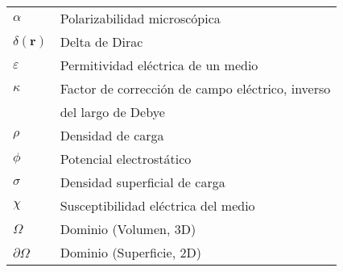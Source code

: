 \begin{tabular}{ll}
	$\alpha$ &  Polarizabilidad microscópica    \\
	$\delta(\mathbf{r})$ & Delta de Dirac     \\
	$\varepsilon$ & Permitividad eléctrica de un medio \\
	$\kappa$ &   Factor de corrección de campo eléctrico, inverso\\
	&	del largo de Debye \\
	$\rho$ & Densidad de carga    \\
	$\phi$ & Potencial electrostático\\
	$\sigma$ & Densidad superficial de carga \\
	$\chi$ & Susceptibilidad eléctrica del medio \\
	$\Omega$ & Dominio (Volumen, 3D) \\	
	$\partial\Omega$ & Dominio (Superficie, 2D) \\
\end{tabular}
